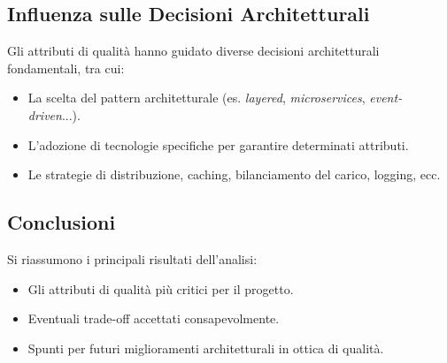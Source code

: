 \subsection{Influenza sulle Decisioni Architetturali}

Gli attributi di qualità hanno guidato diverse decisioni architetturali fondamentali, tra cui:

\begin{itemize}
  \item La scelta del pattern architetturale (es. \textit{layered}, \textit{microservices}, \textit{event-driven}...).
  \item L’adozione di tecnologie specifiche per garantire determinati attributi.
  \item Le strategie di distribuzione, caching, bilanciamento del carico, logging, ecc.
\end{itemize}

\subsection{Conclusioni}

Si riassumono i principali risultati dell’analisi:

\begin{itemize}
  \item Gli attributi di qualità più critici per il progetto.
  \item Eventuali trade-off accettati consapevolmente.
  \item Spunti per futuri miglioramenti architetturali in ottica di qualità.
\end{itemize}








